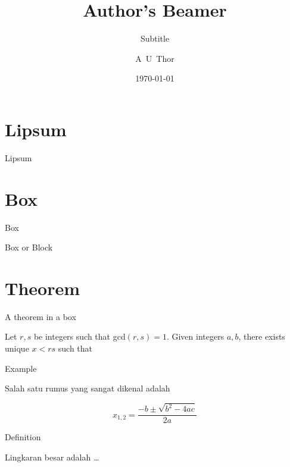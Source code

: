 \documentclass[11pt,aspectratio=169]{beamer}
\title{Author's Beamer}
\subtitle{Subtitle}
\author{A~U~Thor}
\institute{Author's Affiliation}
\date{\today}
\begin{document}
\begin{frame}[plain]
\maketitle
\end{frame}

\begin{frame}{\contentsname}
\tableofcontents
\end{frame}

\section{Lipsum}
\begin{frame}{Lipsum}
\lipsum[3]
\end{frame}

\section{Box}
\begin{frame}{Box}
\begin{block}{Box or Block}
\lipsum[3]
\end{block}
\end{frame}

\section{Theorem}
\begin{frame}{A theorem in a box}
\begin{theorem}
Let $r, s$ be integers such that gcd$(r, s)=1$. Given integers $a,b$, there exists unique $x <rs$ such that
\end{theorem}
\end{frame}

\begin{frame}{Example}
\begin{example}
Salah satu rumus yang sangat dikenal adalah

\begin{equation}
    x_{1,2} = \frac{-b \pm \sqrt{b^2 - 4 a c}}{2 a}
\end{equation}
\end{example}
\end{frame}

\begin{frame}{Definition}
\begin{definition}
Lingkaran besar adalah \ldots
\end{definition}
\end{frame}
\end{document}

